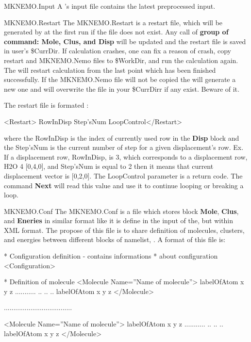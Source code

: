 \begin{filelist}
\item[MKNEMO.Input]
A 's input file contains the latest preprocessed input.
\item[MKNEMO.Restart]
The MKNEMO.Restart is a restart file, which will be generated by  at the first run if the file does not exist. Any call of {\bf group of command: Mole, Clus, and Disp} will be updated and the restart file is saved in user's \$CurrDir. If  calculation crashes, one can fix a reason of crash, copy restart and MKNEMO.Nemo files to \$WorkDir, and run the calculation again. The  will restart calculation from the last point which has been finished successfully. If the MKNEMO.Nemo file will not be copied the  will generate a new one and will overwrite the file in  your \$CurrDirr if any exist. Beware of it.

The restart file is formated :
\begin{sourcelisting}
<Restart>   RowInDisp   Step'sNum LoopControl</Restart>
\end{sourcelisting}
where the RowInDisp is the index of currently used row in the {\bf Disp} block and the Step'sNum is the current number of step for a given displacement's row. Ex. If a displacement row, RowInDisp, is 3, which corresponds to a displacement row, H2O 4 [0,4,0], and Step'sNum is equal to 2 then it means that current displacement vector is [0,2,0]. The LoopControl parameter is a return code. The command {\bf Next} will read this value and use it to continue looping or breaking a loop.
\item[MKNEMO.Conf]
The MKNEMO.Conf is a file which stores block {\bf Mole}, {\bf Clus}, and {\bf Eneries} in similar format like it is define in the input of the, but within XML format. The propose of this file is to share definition of molecules, clusters, and energies between different blocks of namelist, . A format of this file is:
\begin{sourcelisting}
* Configuration definition - contains informations
* about configuration
<Configuration>

  * Definition of molecule
  <Molecule Name=''Name of molecule''>
    labelOfAtom x  y  z
    ........... .. .. ..
    labelOfAtom x  y  z
  </Molecule>

  ....................................


  <Molecule Name=''Name of molecule''>
    labelOfAtom x  y  z
    ........... .. .. ..
    labelOfAtom x  y  z
  </Molecule>



\end{sourcelisting}
\end{filelist}
